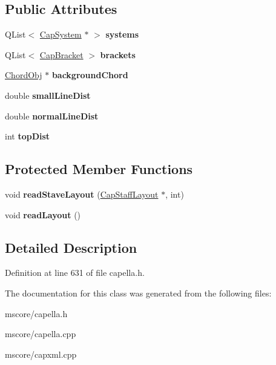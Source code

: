 \subsection*{Public Attributes}
\begin{DoxyCompactItemize}
\item 
\mbox{\label{class_ms_1_1_capella_af4fff8a4466ccd2ea04a63f979e26dd2}} 
Q\+List$<$ \hyperlink{struct_ms_1_1_cap_system}{Cap\+System} $\ast$ $>$ {\bfseries systems}
\item 
\mbox{\label{class_ms_1_1_capella_ae529678239670df041fac3d413cd474c}} 
Q\+List$<$ \hyperlink{struct_ms_1_1_cap_bracket}{Cap\+Bracket} $>$ {\bfseries brackets}
\item 
\mbox{\label{class_ms_1_1_capella_a15a12143c2f1962fbac02fc02bbfb3dc}} 
\hyperlink{class_ms_1_1_chord_obj}{Chord\+Obj} $\ast$ {\bfseries background\+Chord}
\item 
\mbox{\label{class_ms_1_1_capella_a18cce662dd29a2f0ad508eb8346760a0}} 
double {\bfseries small\+Line\+Dist}
\item 
\mbox{\label{class_ms_1_1_capella_a30e6d22d1211aab6d7fb0404d7b52577}} 
double {\bfseries normal\+Line\+Dist}
\item 
\mbox{\label{class_ms_1_1_capella_a8c4e2c2c6bf06b89afbc9e4bf60b3de4}} 
int {\bfseries top\+Dist}
\end{DoxyCompactItemize}
\subsection*{Protected Member Functions}
\begin{DoxyCompactItemize}
\item 
\mbox{\label{class_ms_1_1_capella_a9e665d644975a89ce1dd05896ea906ac}} 
void {\bfseries read\+Stave\+Layout} (\hyperlink{struct_ms_1_1_cap_staff_layout}{Cap\+Staff\+Layout} $\ast$, int)
\item 
\mbox{\label{class_ms_1_1_capella_a6292ced475c69733be294f85cde57266}} 
void {\bfseries read\+Layout} ()
\end{DoxyCompactItemize}


\subsection{Detailed Description}


Definition at line 631 of file capella.\+h.



The documentation for this class was generated from the following files\+:\begin{DoxyCompactItemize}
\item 
mscore/capella.\+h\item 
mscore/capella.\+cpp\item 
mscore/capxml.\+cpp\end{DoxyCompactItemize}
